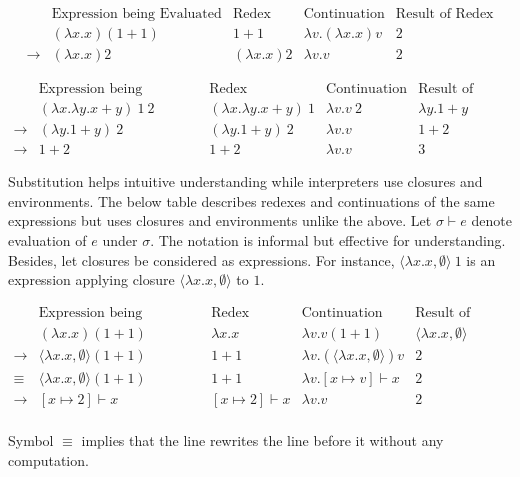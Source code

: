 \[
\begin{array}{ccccc}
&\text{Expression being Evaluated} & \text{Redex} & \text{Continuation} &
\text{Result of Redex} \\
& (\lambda x.x)(1+1) & 1+1 & \lambda v.(\lambda x.x)v & 2 \\
\rightarrow& (\lambda x.x)2 & (\lambda x.x)2 & \lambda v.v & 2
\end{array}
\]

\[
\begin{array}{ccccc}
&\text{Expression being Evaluated} & \text{Redex} & \text{Continuation} &
\text{Result of Redex} \\
& (\lambda x.\lambda y.x+y)\ 1\ 2 & (\lambda x.\lambda y.x+y)\ 1& \lambda v.v\ 2
& \lambda y.1+y \\
\rightarrow & (\lambda y.1+y)\ 2 & (\lambda y.1+y)\ 2 & \lambda v.v & 1+2 \\
\rightarrow & 1+2 & 1+2 & \lambda v.v & 3
\end{array}
\]

Substitution helps intuitive understanding while interpreters use closures and
environments. The below table describes redexes and continuations of the same
expressions but uses closures and environments unlike the above. Let
$\sigma\vdash e$ denote evaluation of $e$ under $\sigma$. The notation is
informal but effective for understanding. Besides, let closures be considered as
expressions. For instance, $\langle\lambda x.x,\emptyset\rangle\ 1$ is an
expression applying closure $\langle\lambda x.x,\emptyset\rangle$ to $1$.

\[
\begin{array}{ccccc}
&\text{Expression being Evaluated} & \text{Redex} & \text{Continuation} &
\text{Result of Redex} \\
& (\lambda x.x)(1+1) & \lambda x.x & \lambda v.v(1+1) & \langle\lambda
x.x,\emptyset\rangle \\
\rightarrow&\langle\lambda x.x,\emptyset\rangle(1+1) & 1+1 & \lambda
v.(\langle\lambda x.x,\emptyset\rangle)v & 2 \\
\equiv&\langle\lambda x.x,\emptyset\rangle(1+1) & 1+1 & \lambda v.[x\mapsto
v]\vdash x & 2 \\
\rightarrow& [x\mapsto 2]\vdash x & [x\mapsto 2]\vdash x & \lambda v.v & 2 \\
\end{array}
\]

Symbol $\equiv$ implies that the line rewrites the line before it without any
computation.

